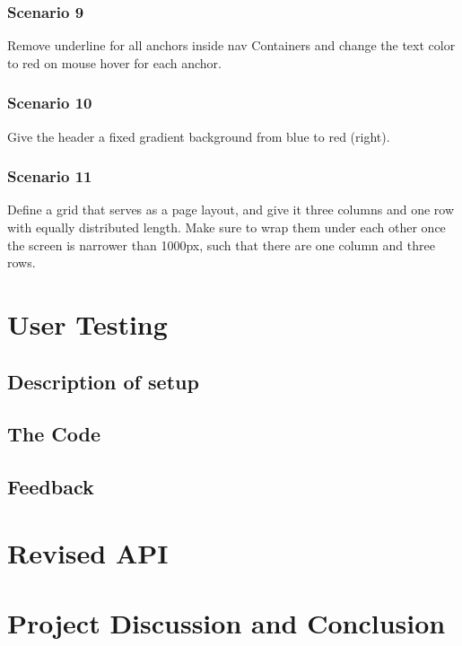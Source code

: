 \documentclass[12pt]{article}
\begin{document}
\subsubsection{Scenario 9}
Remove underline for all anchors inside nav Containers and change the text color to red on mouse hover for each anchor.
    
\subsubsection{Scenario 10}
Give the header a fixed gradient background from blue to red (right).

\subsubsection{Scenario 11}
Define a grid that serves as a page layout, and give it three columns and one row with equally distributed length. Make sure to wrap them under each other once the screen is narrower than 1000px, such that there are one column and three rows.

\section{User Testing}

\subsection{Description of setup}

\subsection{The Code}

\subsection{Feedback}

\section{Revised API}

\section{Project Discussion and Conclusion}
\end{document}
